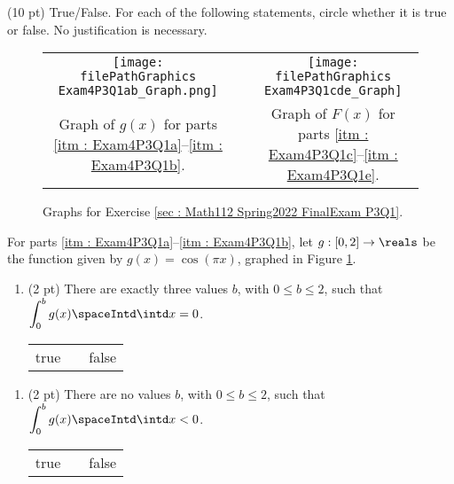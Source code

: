 (10 pt) True/False. For each of the following statements, circle whether it is true or false. No justification is necessary.
\begin{figure}[t]
\centering
\begin{tabular}{*{3}{c}}
\texttt{[image: \\filePathGraphics Exam4P3Q1ab\_Graph.png]}
&
\hspace{0.1\textwidth}
&
\texttt{[image: \\filePathGraphics Exam4P3Q1cde\_Graph]}
\\
Graph of $g(x)$ for parts \ref{itm : Exam4P3Q1a}--\ref{itm : Exam4P3Q1b}.
&
&
Graph of $F(x)$ for parts \ref{itm : Exam4P3Q1c}--\ref{itm : Exam4P3Q1e}.
\end{tabular}
\caption{Graphs for Exercise \ref{sec : Math112 Spring2022 FinalExam P3Q1}.}%
\label{fig : E4Q1 Graphs}%
\end{figure}

\noindent{}For parts \ref{itm : Exam4P3Q1a}--\ref{itm : Exam4P3Q1b}, let $g : [0,2] \rightarrow \reals$ be the function given by $g(x) = \cos(\pi x)$, graphed in Figure \ref{fig : E4Q1 Graphs}.

\begin{enumerate}[label=(\alph*)]
\item\label{itm : Exam4P3Q1a} (2 pt) There are exactly three values $b$, with $0 \leq b \leq 2$, such that $\displaystyle\int_{0}^{b} g(x) \spaceIntd \intd x = 0$.
\begin{center}
\begin{tabular}{c c c}
true	&	\hspace{1in}	&	false
\end{tabular}
\end{center}
\end{enumerate}




\begin{enumerate}[resume,label=(\alph*)]
\item\label{itm : Exam4P3Q1b} (2 pt) There are no values $b$, with $0 \leq b \leq 2$, such that $\displaystyle\int_{0}^{b} g(x) \spaceIntd \intd x < 0$.
\begin{center}
\begin{tabular}{c c c}
true	&	\hspace{1in}	&	false
\end{tabular}
\end{center}
\end{enumerate}


